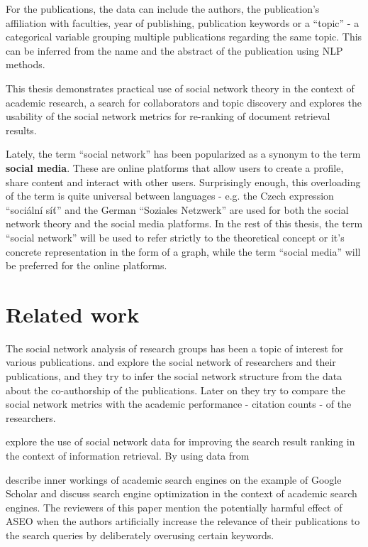 For the publications, the data can include the authors, the publication's affiliation with faculties, year of publishing, publication keywords or a ``topic'' - a categorical variable grouping multiple publications regarding the same topic. This can be inferred from the name and the abstract of the publication using NLP methods.

This thesis demonstrates practical use of social network theory in the context of academic research, a search for collaborators and topic discovery and explores the usability of the social network metrics for re-ranking of document retrieval results.

Lately, the term ``social network'' has been popularized as a synonym to the term \textbf{social media}.
These are online platforms that allow users to create a profile, share content and interact with other users.
Surprisingly enough, this overloading of the term is quite universal between languages - e.g. the Czech expression ``sociální síť'' and the German ``Soziales Netzwerk'' are used for both the social network theory and the social media platforms.
In the rest of this thesis, the term ``social network'' will be used to refer strictly to the theoretical concept or it's concrete representation in the form of a graph, while the term ``social media'' will be preferred for the online platforms.

\section*{Related work}

The social network analysis of research groups has been a topic of interest for various publications. 
\cite{ORDOOBADI2019S164} and \cite{CIMENLER2014667} explore the social network of researchers and their publications, and they try to infer the 
social network structure from the data about the co-authorship of the publications. 
Later on they try to compare the social network metrics with the academic performance - citation counts - of the researchers.

\cite{inproceedings} explore the use of social network data for improving the search result ranking in the context of information retrieval.
By using data from 

\cite{aseo} describe inner workings of academic search engines on the example of Google Scholar and
discuss search engine optimization in the context of academic search engines. 
The reviewers of this paper mention the potentially harmful effect of \ac{ASEO} when the authors artificially increase 
the relevance of their publications to the search queries by deliberately overusing certain keywords.




